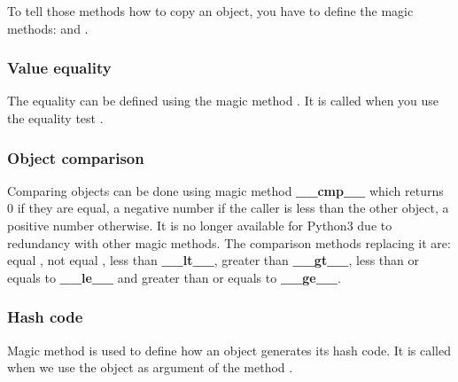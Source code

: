 \documentclass{KodeBook}
\begin{document}


To tell those methods how to copy an object, you have to define the magic methods:  and .



\subsubsection{Value equality}

The equality can be defined using the magic method . 
It is called when you use the equality test \keyword{==}.



\subsubsection{Object comparison}

Comparing objects can be done using magic method \textbf{\_\_cmp\_\_} which returns 0 if they are equal, a negative number if the caller is less than the other object, a positive number otherwise.
It is no longer available for Python3 due to redundancy with other magic methods. 
The comparison methods replacing it are: equal , not equal , less than \textbf{\_\_lt\_\_}, greater than \textbf{\_\_gt\_\_}, less than or equals to \textbf{\_\_le\_\_} and greater than or equals to \textbf{\_\_ge\_\_}.



\subsubsection{Hash code}

Magic method  is used to define how an object generates its hash code.
It is called when we use the object as argument of the method .


\end{document}

